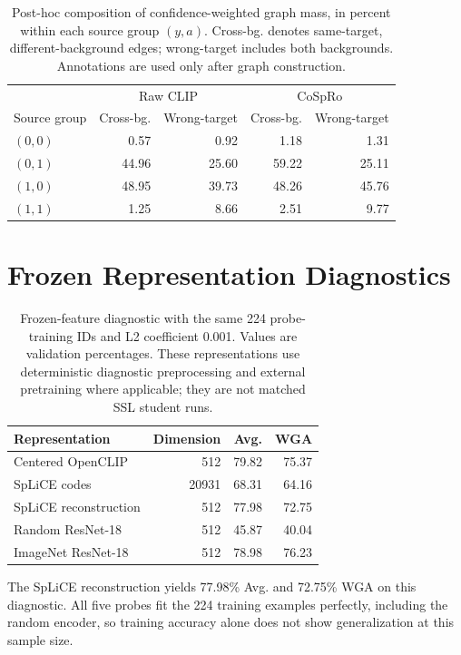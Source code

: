 \documentclass{article}
\begin{document}
\begin{table}[htbp]
\centering\small
\caption{Post-hoc composition of confidence-weighted graph mass, in percent within each source group $(y,a)$. Cross-bg. denotes same-target, different-background edges; wrong-target includes both backgrounds. Annotations are used only after graph construction.}
\begin{tabular}{lrrrr}
\toprule
& \multicolumn{2}{c}{Raw CLIP} & \multicolumn{2}{c}{CoSpRo} \\
Source group & Cross-bg. & Wrong-target & Cross-bg. & Wrong-target \\
\midrule
$(0,0)$ & 0.57 & 0.92 & 1.18 & 1.31 \\
$(0,1)$ & 44.96 & 25.60 & 59.22 & 25.11 \\
$(1,0)$ & 48.95 & 39.73 & 48.26 & 45.76 \\
$(1,1)$ & 1.25 & 8.66 & 2.51 & 9.77 \\
\bottomrule
\end{tabular}
\label{tab:graph}
\end{table}

\section{Frozen Representation Diagnostics}\label{app:signal}
\begin{table}[H]
\centering
\caption{Frozen-feature diagnostic with the same 224 probe-training IDs and L2 coefficient 0.001. Values are validation percentages. These representations use deterministic diagnostic preprocessing and external pretraining where applicable; they are not matched SSL student runs.}
\begin{tabular}{lrrr}
\toprule
Representation & Dimension & Avg. & WGA \\
\midrule
Centered OpenCLIP & 512 & 79.82 & 75.37 \\
SpLiCE codes & 20931 & 68.31 & 64.16 \\
SpLiCE reconstruction & 512 & 77.98 & 72.75 \\
Random ResNet-18 & 512 & 45.87 & 40.04 \\
ImageNet ResNet-18 & 512 & 78.98 & 76.23 \\
\bottomrule
\end{tabular}
\label{tab:signal}
\end{table}

The SpLiCE reconstruction yields 77.98\% Avg. and 72.75\% WGA on this diagnostic. All five probes fit the 224 training examples perfectly, including the random encoder, so training accuracy alone does not show generalization at this sample size.
\end{document}
